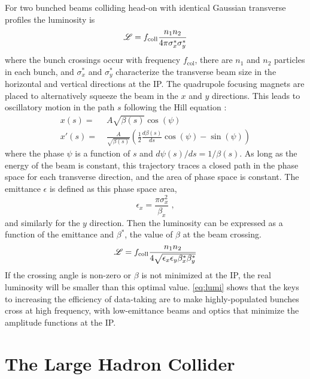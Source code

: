 For two bunched beams colliding head-on with identical Gaussian transverse profiles the luminosity is
\begin{equation}
\mathscr{L} = f_\mathrm{coll} \frac{n_1 n_2}{4 \pi \sigma_x^* \sigma_y^*}
\end{equation}
where the bunch crossings occur with frequency $f_\mathrm{col}$, there are $n_1$ and $n_2$ particles in each bunch, and $\sigma_x^*$ and $\sigma_y^*$ characterize the transverse beam size in the horizontal and vertical directions at the \ac{IP}.
The quadrupole focusing magnets are placed to alternatively squeeze the beam in the $x$ and $y$ directions.
This leads to oscillatory motion in the path $s$ following the Hill equation \cite{Tanabashi:2018oca}:
\begin{align}
x(s) =& \; A \sqrt{\beta(s)} \cos (\psi) \\
x'(s) =& \; \frac{A}{\sqrt{\beta(s)}} \left( \frac{1}{2} \frac{d\beta(s)}{ds} \cos(\psi) - \sin(\psi) \right)
\end{align}
where the phase $\psi$ is a function of $s$ and $d\psi(s)/ds = 1/\beta(s)$.
As long as the energy of the beam is constant, this trajectory traces a closed path in the phase space for each transverse direction, and the area of phase space is constant.
The emittance $\epsilon$ is defined as this phase space area,
\begin{equation}
\epsilon_x = \frac{\pi \sigma_x^2}{\beta_x} \; ,
\end{equation}
and similarly for the $y$ direction.
Then the luminosity can be expressed as a function of the emittance and $\beta^*$, the value of $\beta$ at the beam crossing.
\begin{equation}
\label{eq:lumi}
\mathscr{L} = f_\mathrm{coll} \frac{n_1 n_2}{4 \sqrt{\epsilon_x \epsilon_y \beta_x^* \beta_y^*}}
\end{equation}
If the crossing angle is non-zero or $\beta$ is not minimized at the \ac{IP}, the real luminosity will be smaller than this optimal value. %
\cref{eq:lumi} shows that the keys to increasing the efficiency of data-taking are to make highly-populated bunches cross at high frequency, with low-emittance beams and optics that minimize the amplitude functions at the \ac{IP}.

\section{The Large Hadron Collider}

